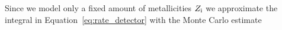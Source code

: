 \documentclass[twocolumn]{aastex63}
\newcommand\rate{\mathcal{R}}
\newcommand{\monef}{\ensuremath{m_{1,\rm{f}}}\xspace}
\newcommand{\mtwof}{\ensuremath{m_{2,\rm{f}}}\xspace}
\newcommand{\Zi}{\ensuremath{Z_{\rm{i}}}\xspace}
\newcommand{\Hubble}{\ensuremath{\mathcal{H}_0}\xspace}
\newcommand{\tdelay}{\ensuremath{{t}_{\rm{delay}}}\xspace}
\newcommand{\ts}{\ensuremath{{t}_{\rm{s}}}\xspace}
\newcommand{\tform}{\ensuremath{{t}_{\rm{form}}}\xspace}
\newcommand{\tmerger}{\ensuremath{{t}_{\rm{m}}}\xspace}
\newcommand{\tdet}{\ensuremath{{t}_{\rm{det}}}\xspace}
\newcommand{\Ndet}{\ensuremath{{N}_{\rm{det}}}\xspace}
\newcommand{\Pdet}{\ensuremath{{P}_{\rm{det}}}\xspace}
\newcommand{\Vc}{\ensuremath{{V}_{\rm{c}}}\xspace}
\newcommand{\DL}{\ensuremath{{D}_{\rm{L}}}\xspace}
\newcommand{\Dc}{\ensuremath{{D}_{\rm{c}}}\xspace}
\newcommand*\diff{\mathop{}\!\mathrm{d}}
\begin{document}
%
%
%
%
%
%
%
%


Since we model only a fixed amount of metallicities $\Zi$ we approximate the integral in Equation~\ref{eq:rate_detector}  with the Monte Carlo estimate
\end{document}
